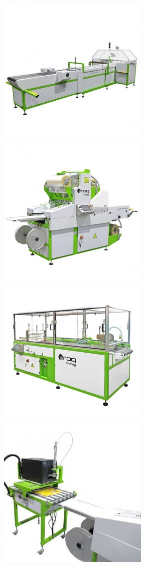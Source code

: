 \begin{frame}
\begin{figure}[ht]
\begin{center}
\includegraphics[scale=0.2]{./image/ROQ/maquinas/600x6004-275x275.jpg}
\includegraphics[scale=0.2]{./image/ROQ/maquinas/600x6005-275x275.jpg}
\includegraphics[scale=0.2]{./image/ROQ/maquinas/600X600-275x275.jpg}
\includegraphics[scale=0.2]{./image/ROQ/maquinas/DR7A6026_WEB1-275x275.jpg}

\end{center}
\end{figure}
\end{frame}
